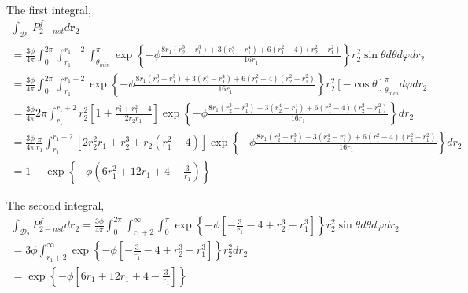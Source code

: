 The first integral, 
\begin{multline}
    \int_{
        \mathcal{D}_1 
    }
    P_{2-nst}^f
    d\textbf{r}_2 
    \\=
    \frac{3 \phi}{4\pi}
    \int_0^{2\pi}
    \int_{r_1}^{r_1+2}
    \int_{\theta_{min}}^{\pi}
    \exp\left\{-\phi 
    \frac{ 
    8 r_{1} \left(r_{2}^{3} - r_{1}^{3}\right) 
   + 3 (r_{2}^{4} - r_{1}^{4})
   + 6  \left(r_{1}^{2} - 4 \right) \left(r_{2}^{2} - r_{1}^{2}\right)}{16 r_{1}}
    \right\} 
    r_2^2
    \sin\theta
    d\theta
    d\varphi
    dr_2
    \\=
    \frac{3 \phi}{4\pi}
    \int_0^{2\pi}
    \int_{r_1}^{r_1+2}
    \exp\left\{-\phi 
    \frac{ 
    8 r_{1} \left(r_{2}^{3} - r_{1}^{3}\right) 
   + 3 (r_{2}^{4} - r_{1}^{4})
   + 6  \left(r_{1}^{2} - 4 \right) \left(r_{2}^{2} - r_{1}^{2}\right)}{16 r_{1}}
    \right\} 
    r_2^2
    [-\cos\theta]_{\theta_{min}}^{\pi}
    d\varphi
    dr_2
    \\=
    \frac{3 \phi}{4\pi}
    2\pi
    \int_{r_1}^{r_1+2}
    r_2^2
    [1
    + \frac{
        r_2^2 
        + r_1^2
         - 4
    }{2 r_2 r_1}]
    \exp\left\{-\phi 
    \frac{ 
    8 r_{1} \left(r_{2}^{3} - r_{1}^{3}\right) 
   + 3 (r_{2}^{4} - r_{1}^{4})
   + 6  \left(r_{1}^{2} - 4 \right) \left(r_{2}^{2} - r_{1}^{2}\right)}{16 r_{1}}
    \right\} 
    dr_2
    \\=
    \frac{3 \phi}{4\pi}
    \frac{\pi}{r_1}
    \int_{r_1}^{r_1+2}
    [2r_2^2r_1
    + 
        r_2^3
        + r_2 (r_1^2
         - 4)]
    \exp\left\{-\phi 
    \frac{ 
    8 r_{1} \left(r_{2}^{3} - r_{1}^{3}\right) 
   + 3 (r_{2}^{4} - r_{1}^{4})
   + 6  \left(r_{1}^{2} - 4 \right) \left(r_{2}^{2} - r_{1}^{2}\right)}{16 r_{1}}
    \right\} 
    dr_2
    \\
    =
    1 
    - 
    \exp\left\{
        -\phi (6r_1^2 + 12 r_1 + 4 - \frac{3}{r_1})
        \right\}
\end{multline}

The second integral, 
\begin{multline}
    \int_{
        \mathcal{D}_2 
    }
    P_{2-nst}^f
    d\textbf{r}_2 
    =
    \frac{3 \phi}{4\pi}
    \int_0^{2\pi}
    \int_{r_1+2}^\infty
    \int_{0}^{\pi}
    \exp\left\{-\phi 
    \left[
        -\frac{3}{r_1}
        - 4 
        + r_2^3
        -r_1^3
    \right]
    \right\} 
    r_2^2
    \sin\theta
    d\theta
    d\varphi
    dr_2 \\
    =
    3 \phi
    \int_{r_1+2}^{\infty}
    \exp\left\{-\phi 
    \left[
        -\frac{3}{r_1}
        - 4 
        + r_2^3
        -r_1^3
    \right]
    \right\} 
    r_2^2
    dr_2 \\
    = \exp\left\{
        - \phi [
            6 r_1 
            + 12 r_1
            + 4
            - \frac{3}{r_1}
        ]
    \right\}
\end{multline}

